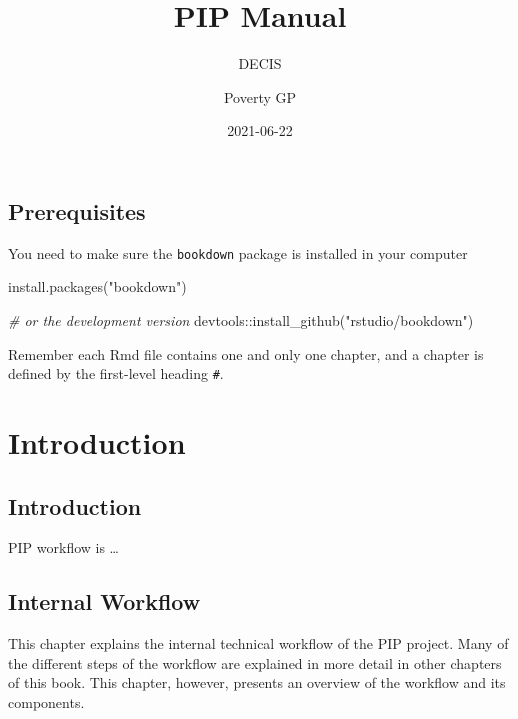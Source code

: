 \documentclass[
]{book}
\title{PIP Manual}
\author{DECIS \and Poverty GP}
\date{2021-06-22}
\newenvironment{Shaded}{\begin{snugshade}}{\end{snugshade}}
\newcommand{\CommentTok}[1]{\textcolor[rgb]{0.56,0.35,0.01}{\textit{#1}}}
\newcommand{\FunctionTok}[1]{\textcolor[rgb]{0.00,0.00,0.00}{#1}}
\newcommand{\NormalTok}[1]{#1}
\newcommand{\SpecialCharTok}[1]{\textcolor[rgb]{0.00,0.00,0.00}{#1}}
\newcommand{\StringTok}[1]{\textcolor[rgb]{0.31,0.60,0.02}{#1}}
\begin{document}
\maketitle

{
\setcounter{tocdepth}{1}
\tableofcontents
}
\hypertarget{prerequisites}{%
\chapter*{Prerequisites}\label{prerequisites}}

You need to make sure the \texttt{bookdown} package is installed in your computer

\begin{Shaded}
\begin{Highlighting}[]
\FunctionTok{install.packages}\NormalTok{(}\StringTok{"bookdown"}\NormalTok{)}

\CommentTok{\# or the development version}
\NormalTok{ devtools}\SpecialCharTok{::}\FunctionTok{install\_github}\NormalTok{(}\StringTok{"rstudio/bookdown"}\NormalTok{)}
\end{Highlighting}
\end{Shaded}

Remember each Rmd file contains one and only one chapter, and a chapter is defined by the first-level heading \texttt{\#}.

\hypertarget{part-introduction}{%
\part{Introduction}\label{part-introduction}}

\hypertarget{intro}{%
\chapter{Introduction}\label{intro}}

PIP workflow is \ldots{}

\hypertarget{internal-workflow}{%
\chapter{Internal Workflow}\label{internal-workflow}}

This chapter explains the internal technical workflow of the PIP project. Many
of the different steps of the workflow are explained in more detail in other
chapters of this book. This chapter, however, presents an overview of the
workflow and its components.
\end{document}
